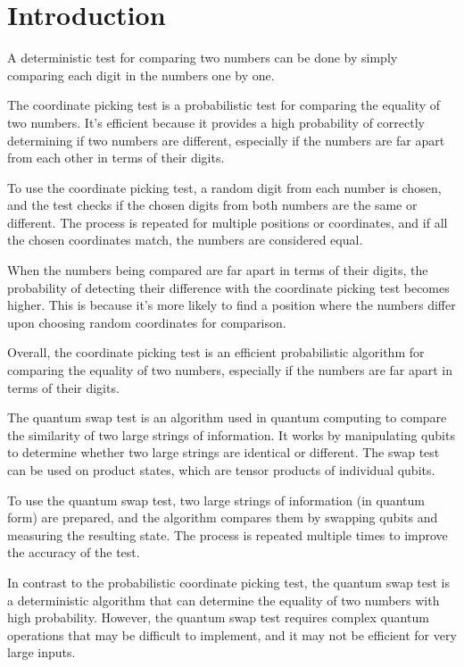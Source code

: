 \chapter{Introduction}


A deterministic test for comparing two numbers can be done by simply comparing each digit in the numbers one by one. 



The coordinate picking test is a probabilistic test for comparing the equality of two numbers. It's efficient because it provides a high probability of correctly determining if two numbers are different, especially if the numbers are far apart from each other in terms of their digits.

To use the coordinate picking test, a random digit from each number is chosen, and the test checks if the chosen digits from both numbers are the same or different. The process is repeated for multiple positions or coordinates, and if all the chosen coordinates match, the numbers are considered equal.

When the numbers being compared are far apart in terms of their digits, the probability of detecting their difference with the coordinate picking test becomes higher. This is because it's more likely to find a position where the numbers differ upon choosing random coordinates for comparison.

Overall, the coordinate picking test is an efficient probabilistic algorithm for comparing the equality of two numbers, especially if the numbers are far apart in terms of their digits.



The quantum swap test is an algorithm used in quantum computing to compare the similarity of two large strings of information. It works by manipulating qubits to determine whether two large strings are identical or different. The swap test can be used on product states, which are tensor products of individual qubits. 

To use the quantum swap test, two large strings of information (in quantum form) are prepared, and the algorithm compares them by swapping qubits and measuring the resulting state. The process is repeated multiple times to improve the accuracy of the test. 

In contrast to the probabilistic coordinate picking test, the quantum swap test is a deterministic algorithm that can determine the equality of two numbers with high probability. However, the quantum swap test requires complex quantum operations that may be difficult to implement, and it may not be efficient for very large inputs.

